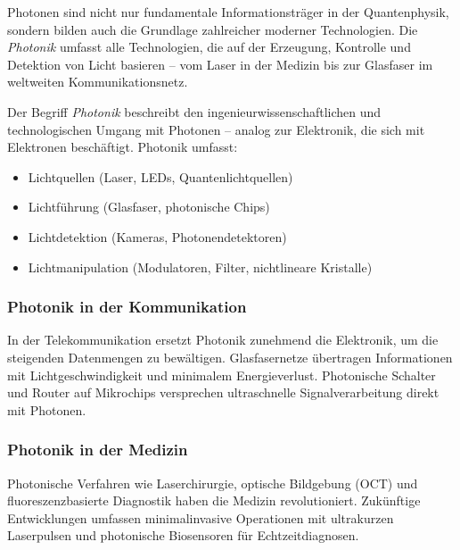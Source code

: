 Photonen sind nicht nur fundamentale Informationsträger in der Quantenphysik, sondern bilden auch die Grundlage zahlreicher moderner Technologien.  
Die \emph{Photonik} umfasst alle Technologien, die auf der Erzeugung, Kontrolle und Detektion von Licht basieren – vom Laser in der Medizin bis zur Glasfaser im weltweiten Kommunikationsnetz.
\medskip
\begin{tcolorbox}[hinweisbox, title=Was bedeutet „Photonik“? \label{box:photonics_definition}]
	\small
	Der Begriff \emph{Photonik} beschreibt den ingenieurwissenschaftlichen und technologischen Umgang mit Photonen – analog zur Elektronik, die sich mit Elektronen beschäftigt.  
	Photonik umfasst:
	\begin{itemize}
		\item Lichtquellen (Laser, LEDs, Quantenlichtquellen)
		\item Lichtführung (Glasfaser, photonische Chips)
		\item Lichtdetektion (Kameras, Photonendetektoren)
		\item Lichtmanipulation (Modulatoren, Filter, nichtlineare Kristalle)
	\end{itemize}
\end{tcolorbox}

\subsubsection{Photonik in der Kommunikation}

In der Telekommunikation ersetzt Photonik zunehmend die Elektronik, um die steigenden Datenmengen zu bewältigen. Glasfasernetze übertragen Informationen mit Lichtgeschwindigkeit und minimalem Energieverlust.  
Photonische Schalter und Router auf Mikrochips versprechen ultraschnelle Signalverarbeitung direkt mit Photonen.

\subsubsection{Photonik in der Medizin}

Photonische Verfahren wie Laserchirurgie, optische Bildgebung (OCT) und fluoreszenzbasierte Diagnostik haben die Medizin revolutioniert.  
Zukünftige Entwicklungen umfassen minimalinvasive Operationen mit ultrakurzen Laserpulsen und photonische Biosensoren für Echtzeitdiagnosen.

